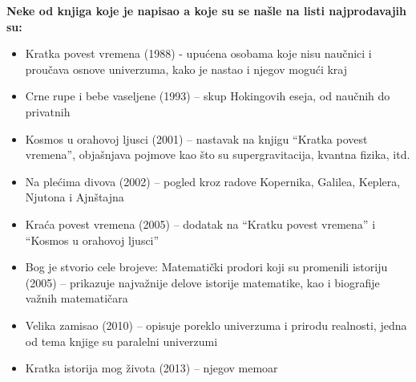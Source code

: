 \documentclass[a4paper, 12pt]{article}
\begin{document}
{\vspace{1cm}
\textbf{Neke od knjiga koje je napisao a koje su se našle na listi najprodavajih su:} 
\cite{bestbooks}
\begin{itemize}
 \item Kratka povest vremena (1988) - upućena osobama koje nisu naučnici i proučava osnove univerzuma, kako je nastao i njegov mogući kraj
 \item Crne rupe i bebe vaseljene (1993) – skup Hokingovih eseja, od naučnih do privatnih
 \item Kosmos u orahovoj ljusci (2001) – nastavak na knjigu “Kratka povest vremena”, objašnjava pojmove kao što su supergravitacija, kvantna fizika, itd.
 \item Na plećima divova (2002) – pogled kroz radove Kopernika, Galilea, Keplera, Njutona i Ajnštajna
 \item Kraća povest vremena (2005) – dodatak na “Kratku povest vremena” i “Kosmos u orahovoj ljusci”
 \item Bog je stvorio cele brojeve: Matematički prodori koji su promenili istoriju (2005) –  prikazuje najvažnije delove istorije matematike, kao i biografije važnih matematičara
 \item Velika zamisao (2010) – opisuje poreklo univerzuma i prirodu realnosti, jedna od tema knjige su paralelni univerzumi
 \item Kratka istorija mog života (2013) – njegov memoar
\end{itemize}

}
\end{document}
